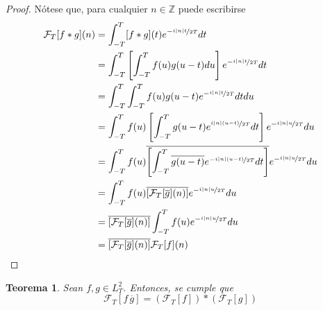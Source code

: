 \documentclass[12pt,letterpaper]{book}
\newtheorem{teorema}{Teorema}[chapter]
\newcommand{\Z}{\mathbb{Z}}
\newcommand{\simint}[1]{\int_{- #1 }^{ #1 }}
\newcommand{\abso}[1]{\left| #1 \right|}
\begin{document}
\begin{proof}
Nótese que, para cualquier $n \in \Z$ puede escribirse
\begin{align*}
\mathcal{F}_T[f \ast g] (n)
&= \simint{T} [f\ast g](t) e^{-\nicefrac{ i \abso{n} t}{2T}} dt \\
&= \simint{T} \left[ \simint{T} f(u) g(u-t) du \right] e^{-\nicefrac{ i \abso{n} t}{2T}} dt \\
&= \simint{T} \simint{T} f(u) g(u-t) e^{-\nicefrac{ i \abso{n} t}{2T}} dt du \\
&= \simint{T} f(u) \left[ \simint{T} g(u-t) e^{\nicefrac{ i \abso{n} (u-t)}{2T}} dt \right] e^{-\nicefrac{ i \abso{n} u}{2T}} du \\
&= \simint{T} f(u) \overline{\left[ \simint{T} \overline{g(u-t)} e^{-\nicefrac{ i \abso{n} (u-t)}{2T}} dt \right]} e^{-\nicefrac{ i \abso{n} u}{2T}} du \\
&= \simint{T} f(u) \overline{\left[ \mathcal{F}_T[\overline{g}](n) \right]} e^{-\nicefrac{ i \abso{n} u}{2T}} du \\
&= \overline{\left[ \mathcal{F}_T[\overline{g}](n) \right]} \simint{T} f(u) e^{-\nicefrac{ i \abso{n} u}{2T}} du \\
&= \overline{\left[ \mathcal{F}_T[\overline{g}](n) \right]} \mathcal{F}_T[f] (n)
\end{align*}
\end{proof}

\begin{teorema}
Sean $f, g \in L^{2}_T$. Entonces, se cumple que
\begin{equation}
\mathcal{F}_T[ f\, \overline{g}] = \left( \mathcal{F}_T[f] \right) \ast \left( \mathcal{F}_T[g] \right)
\end{equation}
\end{teorema}

\end{document}
